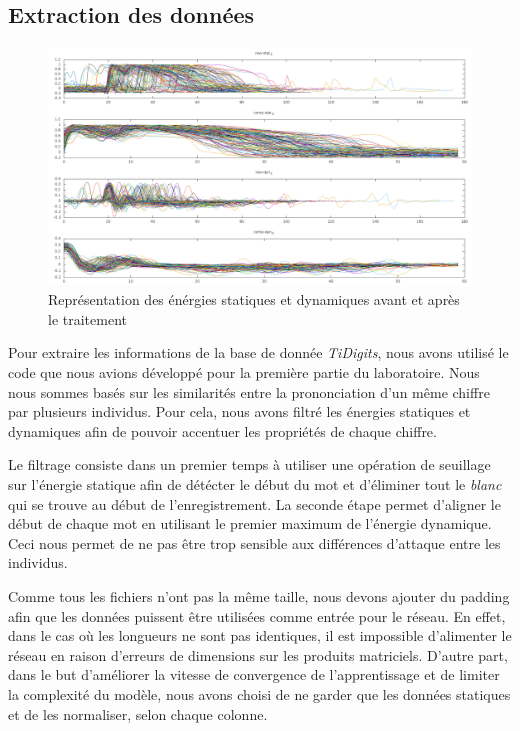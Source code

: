 \documentclass[11pt]{article}
\begin{document}
\subsection{Extraction des donn\'ees}
\begin{figure}[h]
	\centering
	\includegraphics[scale=.3]{img/preprocessing.png}
	\caption{Repr\'esentation des \'en\'ergies statiques et dynamiques avant et
	apr\`es le traitement}
\end{figure}

Pour extraire les informations de la base de donn\'ee {\em TiDigits}, nous
avons utilis\'e le code que nous avions d\'evelopp\'e pour la premi\`ere
partie du laboratoire.
Nous nous sommes bas\'es sur les similarit\'es entre la prononciation d'un
m\^eme chiffre par plusieurs individus. Pour cela, nous avons filtr\'e
les \'energies statiques et dynamiques afin de pouvoir accentuer les
propri\'et\'es de chaque chiffre.


Le filtrage consiste dans un premier temps \`a utiliser une op\'eration de
seuillage sur l'\'energie statique afin de d\'et\'ecter le d\'ebut du mot et
d'\'eliminer tout le {\em blanc} qui se trouve au d\'ebut de l'enregistrement.
La seconde \'etape permet d'aligner le d\'ebut de chaque mot en utilisant le
premier maximum de l'\'energie dynamique.
Ceci nous permet de ne pas \^etre trop sensible aux diff\'erences d'attaque
entre les individus.

Comme tous les fichiers n'ont pas la m\^eme taille, nous devons ajouter
du padding afin que les donn\'ees puissent \^etre utilis\'ees comme
entr\'ee pour le r\'eseau. En effet, dans le cas o\`u les longueurs ne sont pas
identiques, il est impossible d'alimenter le r\'eseau en raison d'erreurs
de dimensions sur les produits matriciels.
D'autre part, dans le but d'am\'eliorer la vitesse de convergence de
l'apprentissage et de limiter la complexit\'e du mod\`ele, nous avons choisi de
ne garder que les donn\'ees statiques et de les normaliser, selon chaque colonne.
\end{document}
